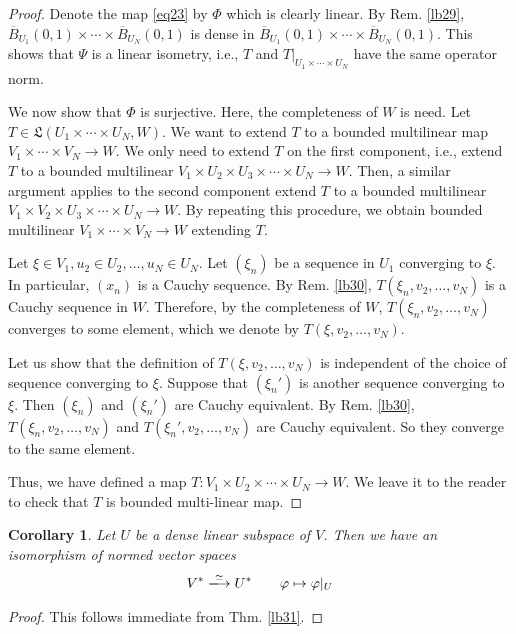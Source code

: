 \documentclass[12pt,b5paper,notitlepage]{article}
\theoremstyle{definition}
\theoremstyle{plain}
\newtheorem{co}[df]{Corollary}
\newcommand{\fk}{\mathfrak}
\newcommand{\ovl}{\overline}
\numberwithin{equation}{section}
\begin{document}
\begin{proof}
Denote the map \eqref{eq23} by $\Phi$ which is clearly linear. By Rem. \ref{lb29}, $\ovl B_{U_1}(0,1)\times\cdots\times\ovl B_{U_N}(0,1)$ is dense in $\ovl B_{U_1}(0,1)\times\cdots\times\ovl B_{U_N}(0,1)$. This shows that $\Psi$ is a linear isometry, i.e., $T$ and $T\big|_{U_1\times\cdots\times U_N}$ have the same operator norm.

We now show that $\Phi$ is surjective. Here, the completeness of $W$ is need. Let $T\in \fk L(U_1\times\cdots\times U_N,W)$. We want to extend $T$ to a bounded multilinear map $V_1\times\cdots\times V_N\rightarrow W$. We only need to extend $T$ on the first component, i.e., extend $T$ to a bounded multilinear $V_1\times U_2\times U_3\times\cdots\times U_N\rightarrow W$. Then, a similar argument applies to the second component extend $T$ to a bounded multilinear $V_1\times V_2\times U_3\times\cdots\times U_N\rightarrow W$. By repeating this procedure, we obtain bounded multilinear $V_1\times\cdots\times V_N\rightarrow W$ extending $T$.

Let $\xi\in V_1,u_2\in U_2,\dots,u_N\in U_N$. Let $(\xi_n)$ be a sequence in $U_1$ converging to $\xi$. In particular, $(x_n)$ is a Cauchy sequence. By Rem. \ref{lb30}, $T(\xi_n,v_2,\dots,v_N)$ is a Cauchy sequence in $W$. Therefore, by the completeness of $W$, $T(\xi_n,v_2,\dots,v_N)$ converges to some element, which we denote by $T(\xi,v_2,\dots,v_N)$.

Let us show that the definition of $T(\xi,v_2,\dots,v_N)$ is independent of the choice of sequence converging to $\xi$. Suppose that $(\xi_n')$ is another sequence converging to $\xi$. Then $(\xi_n)$ and $(\xi_n')$ are Cauchy equivalent. By Rem. \ref{lb30}, $T(\xi_n,v_2,\dots,v_N)$ and $T(\xi_n',v_2,\dots,v_N)$ are Cauchy equivalent. So they converge to the same element.

Thus, we have defined a map $T:V_1\times U_2\times\cdots\times U_N\rightarrow W$. We leave it to the reader to check that $T$ is bounded multi-linear map.
\end{proof}


\begin{co}\label{lb44}
Let $U$ be a dense linear subspace of $V$. Then we have an isomorphism of normed vector spaces
\begin{gather}
V^*\xlongrightarrow{\simeq} U^*\qquad \varphi\mapsto\varphi|_U
\end{gather}
\end{co}

\begin{proof}
This follows immediate from Thm. \ref{lb31}.
\end{proof}
\end{document}
